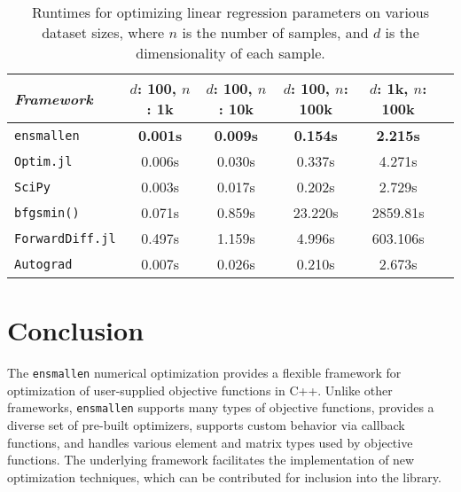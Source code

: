\documentclass[twoside,11pt]{article}
\begin{document}
\begin{table}[t!]
{\small
\centering
\begin{tabular}{lccccc}
\toprule
{\em Framework} & $d$: 100, $n$: 1k & $d$: 100, $n$: 10k & $d$: 100, $n$:
100k & $d$: 1k, $n$: 100k \\
\midrule
\texttt{ensmallen} & {\bf 0.001s} & {\bf 0.009s} & {\bf 0.154s} & {\bf 2.215s} \\
\texttt{Optim.jl}  & 0.006s & 0.030s & 0.337s & 4.271s \\
\texttt{SciPy} & 0.003s & 0.017s & 0.202s & 2.729s \\
\texttt{bfgsmin()} & 0.071s & 0.859s & 23.220s & 2859.81s\\
\texttt{ForwardDiff.jl} & 0.497s & 1.159s & 4.996s & 603.106s \\
\texttt{Autograd} & 0.007s & 0.026s & 0.210s & 2.673s \\
\bottomrule
\end{tabular}
\vspace*{-0.4em}
\caption{
Runtimes for optimizing linear regression parameters on various dataset sizes,
where $n$ is the number of samples,
and $d$ is the dimensionality of each sample.
}
\label{tab:lbfgs}
}
\vspace*{-2.2em}
\end{table}


\section{Conclusion}

The {\tt ensmallen} numerical optimization provides a flexible framework
for optimization of user-supplied objective functions in C++.
Unlike other frameworks, {\tt ensmallen} supports many types of objective functions,
provides a diverse set of pre-built optimizers,
supports custom behavior via callback functions,
and handles various element and matrix types used by objective functions.
The underlying framework facilitates the implementation of new optimization techniques,
which can be contributed for inclusion into the library.
\end{document}
